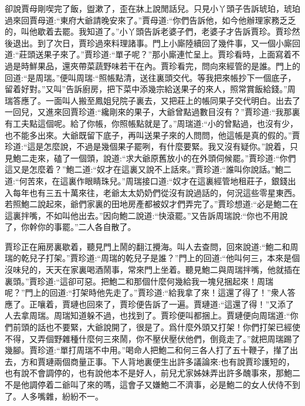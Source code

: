 \begin{parag}
    卻說賈母剛喫完了飯，盥漱了，歪在牀上說閒話兒。只見小丫頭子告訴琥珀，琥珀過來回賈母道:“東府大爺請晚安來了。”賈母道:“你們告訴他，如今他辦理家務乏乏的，叫他歇着去罷。我知道了。”小丫頭告訴老婆子們，老婆子才告訴賈珍。賈珍然後退出。到了次日，賈珍過來料理諸事。門上小廝陸續回了幾件事，又一個小廝回道:“莊頭送果子來了。”賈珍道:“單子呢？”那小廝連忙呈上。賈珍看時，上面寫着不過是時鮮果品，還夾帶菜蔬野味若干在內。賈珍看完，問向來經管的是誰。門上的回道:“是周瑞。”便叫周瑞:“照帳點清，送往裏頭交代。等我把來帳抄下一個底子，留着好對。”又叫”告訴廚房，把下菜中添幾宗給送果子的來人，照常賞飯給錢。”周瑞答應了。一面叫人搬至鳳姐兒院子裏去，又把莊上的帳同果子交代明白。出去了一回兒，又進來回賈珍道:“纔剛來的果子，大爺曾點過數目沒有？”賈珍道:“我那裏有工夫點這個呢。給了你帳，你照帳點就是了。”周瑞道:“小的曾點過，也沒有少，也不能多出來。大爺既留下底子，再叫送果子來的人問問，他這帳是真的假的。”賈珍道:“這是怎麼說，不過是幾個果子罷咧，有什麼要緊。我又沒有疑你。”說着，只見鮑二走來，磕了一個頭，說道:“求大爺原舊放小的在外頭伺候罷。”賈珍道:“你們這又是怎麼着？”鮑二道:“奴才在這裏又說不上話來。”賈珍道:“誰叫你說話。”鮑二道:“何苦來，在這裏作眼睛珠兒。”周瑞接口道:“奴才在這裏經管地租莊子，銀錢出入每年也有三五十萬來往，老爺太太奶奶們從沒有說過話的，何況這些零星東西。若照鮑二說起來，爺們家裏的田地房產都被奴才們弄完了。”賈珍想道:“必是鮑二在這裏拌嘴，不如叫他出去。”因向鮑二說道:“快滾罷。”又告訴周瑞說:“你也不用說了，你幹你的事罷。”二人各自散了。
\end{parag}


\begin{parag}
    賈珍正在廂房裏歇着，聽見門上鬧的翻江攪海。叫人去查問，回來說道:“鮑二和周瑞的乾兒子打架。”賈珍道:“周瑞的乾兒子是誰？”門上的回道:“他叫何三，本來是個沒味兒的，天天在家裏喝酒鬧事，常來門上坐着。聽見鮑二與周瑞拌嘴，他就插在裏頭。”賈珍道:“這卻可惡。把鮑二和那個什麼何幾給我一塊兒捆起來！周瑞呢？”門上的回道:“打架時他先走了。”賈珍道:“給我拿了來！這還了得了！”衆人答應了。正嚷着，賈璉也回來了，賈珍便告訴了一遍。賈璉道:“這還了得！”又添了人去拿周瑞。周瑞知道躲不過，也找到了。賈珍便叫都捆上。賈璉便向周瑞道:“你們前頭的話也不要緊，大爺說開了，很是了。爲什麼外頭又打架！你們打架已經使不得，又弄個野雜種什麼何三來鬧，你不壓伏壓伏他們，倒竟走了。”就把周瑞踢了幾腳。賈珍道:“單打周瑞不中用。”喝命人把鮑二和何三各人打了五十鞭子，攆了出去，方和賈璉兩個商量正事。下人背地裏便生出許多議論來:也有說賈珍護短的，也有說不會調停的，也有說他本不是好人，前兒尤家姊妹弄出許多醜事來，那鮑二不是他調停着二爺叫了來的嗎，這會子又嫌鮑二不濟事，必是鮑二的女人伏侍不到了。人多嘴雜，紛紛不一。
\end{parag}


